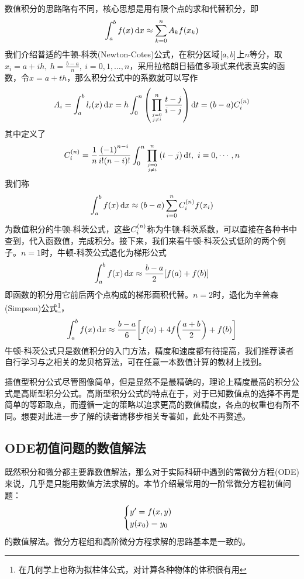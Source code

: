 \documentclass[12pt,a4paper,openany,twoside]{book}
\numberwithin{equation}{section}
\begin{document}
      数值积分的思路略有不同，核心思想是用有限个点的求和代替积分，即
      \begin{equation}
        \int_a^b{f\qty(x)\dd{x}}\approx\sum_{k=0}^n{A_k f\qty(x_k)}
      \end{equation}
      我们介绍普适的牛顿-科茨(Newton-Cotes)公式，在积分区域$\qty[a,b]$上$n$等分，取$x_i=a+ih,\ h=\frac{b-a}{n},\ i=0,1,\dots,n$，采用拉格朗日插值多项式来代表真实的函数，令$x=a+th$，那么积分公式中的系数就可以写作
      \begin{equation}
        A_i=\int_a^b{l_i\qty(x)\dd{x}}=h\int_0^n{\qty(\prod_{j=0 \atop j \neq i}^n{\frac{t-j}{i-j}}) \dd{t}}=\qty(b-a) C_i^\qty(n)
      \end{equation}
      其中定义了
      \begin{equation}
        C_i^\qty(n)=\frac{1}{n} \frac{\qty(-1)^{n-i}}{i !\qty(n-i) !} \int_0^n{\prod_{j=0 \atop j \neq i}^n{\qty(t-j)}\dd{t}},\ i=0,\cdots,n
      \end{equation}
      我们称
      \begin{equation}
        \int_a^b{f\qty(x)\dd{x}}\approx\qty(b-a)\sum_{i=0}^n{C_i^\qty(n)f\qty(x_i)}
      \end{equation}
      为数值积分的牛顿-科茨公式，这些$C_i^\qty(n)$称为牛顿-科茨系数，可以直接在各种书中查到，代入函数值，完成积分。接下来，我们来看牛顿-科茨公式低阶的两个例子。$n=1$时，牛顿-科茨公式退化为梯形公式
      \begin{equation}
        \int_a^b{f\qty(x)\dd{x}}\approx\frac{b-a}{2}\qty[f\qty(a)+f\qty(b)]
      \end{equation}
      即函数的积分用它前后两个点构成的梯形面积代替。$n=2$时，退化为辛普森(Simpson)公式\footnote{在几何学上也称为拟柱体公式，对计算各种物体的体积很有用}，
      \begin{equation}
        \int_a^b{f\qty(x)\dd{x}}\approx\frac{b-a}{6}\qty[f\qty(a)+4f\qty(\frac{a+b}{2})+f\qty(b)]
      \end{equation}
      牛顿-科茨公式只是数值积分的入门方法，精度和速度都有待提高，我们推荐读者自行学习与之相关的龙贝格算法，可在任意一本数值计算的教材上找到。

      插值型积分公式尽管图像简单，但是显然不是最精确的，理论上精度最高的积分公式是高斯型积分公式。高斯型积分公式的特点在于，对于已知数值点的选择不再是简单的等距取点，而遵循一定的策略以追求更高的数值精度，各点的权重也有所不同。想要对此进一步了解的读者请移步相关专著如\cite{numerical_calc_methods}，此处不再赘述。

    \subsection{ODE初值问题的数值解法}
      既然积分和微分都主要靠数值解法，那么对于实际科研中遇到的常微分方程(ODE)来说，几乎是只能用数值方法求解的。本节介绍最常用的一阶常微分方程初值问题：
      \begin{equation*}
        \begin{cases}
          y'=f\qty(x,y)\\
          y\qty(x_0)=y_0
        \end{cases}
      \end{equation*}
      的数值解法。微分方程组和高阶微分方程求解的思路基本是一致的。
\end{document}
